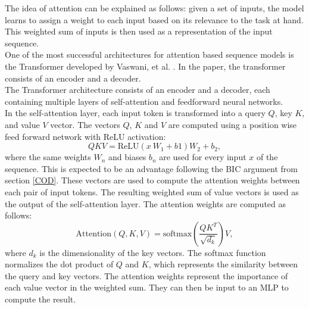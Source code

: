 The idea of attention can be explained as follows: given a set of inputs, the model learns to assign a weight to each input based on its relevance to the 
task at hand.
This weighted sum of inputs is then used as a representation of the input sequence.\\

One of the most successful architectures for attention based sequence models is the Transformer developed by Vaswani, et al. \cite{vaswani2017attention}. In the paper, the transformer 
consists of an encoder and a decoder.\\

The Transformer architecture consists of an encoder and a decoder, each containing multiple layers of self-attention and feedforward neural networks. \\
In the self-attention layer, each input token is transformed into a query $Q$, key $K$, and value $V$ vector. 
The vectors $Q$, $K$ and $V$ are computed using a position wise feed forward network with ReLU activation:
\begin{equation}
    QKV = \text{ReLU}(x \ W_1 + b1)W_2 + b_2,
\end{equation}
where the same weights $W_n$ and biases $b_n$ are used for every input $x$ of the sequence. This is expected to be an advantage following the BIC argument from section \ref{COD}. 
These vectors are used to compute the attention weights between each pair of input tokens.
The resulting weighted sum of value vectors is used as the output of the self-attention layer.
The attention weights are computed as follows:
\begin{equation}
\text{Attention}(Q, K, V) = \text{softmax}\left(\frac{QK^T}{\sqrt{d_k}}\right)V,
\end{equation}
where $d_k$ is the dimensionality of the key vectors.
The softmax function normalizes the dot product of $Q$ and $K$, which represents the similarity between the query and key vectors.
The attention weights represent the importance of each value vector in the weighted sum. They can then be input to an MLP to compute the result.\\
 
